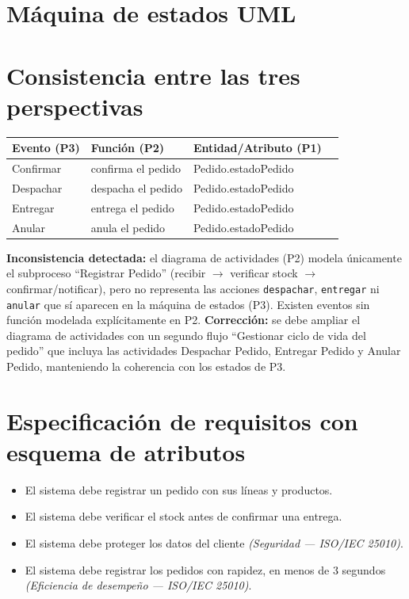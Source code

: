 \documentclass[11pt]{article}
\begin{document}
\section{Máquina de estados UML}


\section{Consistencia entre las tres perspectivas}

\begin{center}
\begin{tabular}{@{}llll@{}}
\toprule
\textbf{Evento (P3)} & \textbf{Función (P2)} & \textbf{Entidad/Atributo (P1)} \\
\midrule
Confirmar & confirma el pedido & Pedido.estadoPedido \\
Despachar & despacha el pedido & Pedido.estadoPedido \\
Entregar  & entrega el pedido  & Pedido.estadoPedido \\
Anular    & anula el pedido    & Pedido.estadoPedido \\
\bottomrule
\end{tabular}
\end{center}

\textbf{Inconsistencia detectada:} el diagrama de actividades (P2) modela únicamente el subproceso
``Registrar Pedido'' (recibir $\rightarrow$ verificar stock $\rightarrow$ confirmar/notificar), pero no
representa las acciones \texttt{despachar}, \texttt{entregar} ni \texttt{anular} que sí aparecen en la
máquina de estados (P3). Existen eventos sin función modelada explícitamente en P2.
\textbf{Corrección:} se debe ampliar el diagrama de actividades con un segundo flujo ``Gestionar ciclo
de vida del pedido'' que incluya las actividades Despachar Pedido, Entregar Pedido y Anular Pedido,
manteniendo la coherencia con los estados de P3.

\section{Especificación de requisitos con esquema de atributos}

\begin{itemize}[leftmargin=1.6cm]
\item[\textbf{RF-01}] El sistema debe registrar un pedido con sus líneas y productos.
\item[\textbf{RF-02}] El sistema debe verificar el stock antes de confirmar una entrega.
\item[\textbf{RNF-01}] El sistema debe proteger los datos del cliente \textit{(Seguridad --- ISO/IEC 25010)}.
\item[\textbf{RNF-02}] El sistema debe registrar los pedidos con rapidez, en menos de 3 segundos \textit{(Eficiencia de desempeño --- ISO/IEC 25010)}.
\end{itemize}
\end{document}
